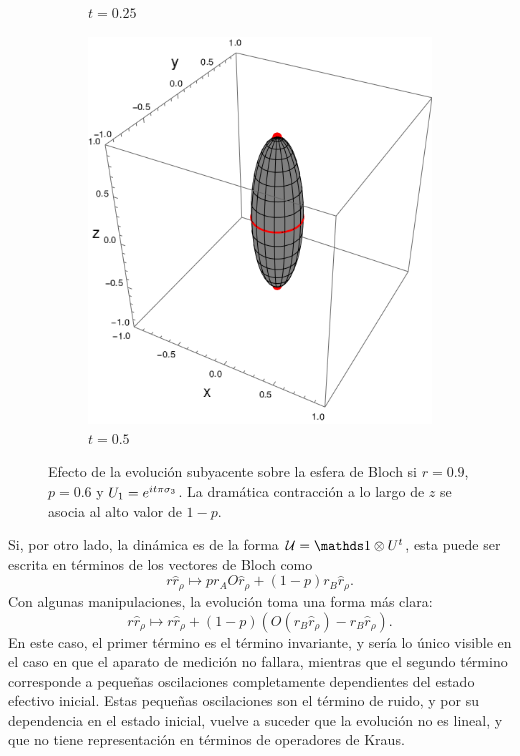 \begin{figure}[h!]
\begin{subfigure}{0.32\textwidth}
      \caption{$t=0.25$}
    \end{subfigure}
    \begin{subfigure}{0.32\textwidth}
      \centering
      \includegraphics[width=0.9\linewidth]{chapter3/figures_separable/U1xU2_H1=Pi(sz)_H2=Id_z=0.9_p=0.6t=0.5.png}
      \caption{$t=0.5$}
    \end{subfigure}
    \caption{Efecto de la evolución subyacente sobre la esfera de Bloch si $r=0.9$, $p=0.6$ y $U_{1}=e^{it\pi \sigma_{3}}$. La dramática contracción a lo largo de $z$ se asocia al alto valor de $1-p$.}
    \label{fig:FaseChangeSequence}
\end{figure}

Si, por otro lado, la dinámica es de la forma $\mcU=\Id\otimes U^{t}$, esta puede ser escrita en términos de los vectores de Bloch como
\begin{equation*}
    r\hat{r}_{\rho}\mapsto pr_{A}O\hat{r}_{\rho}+(1-p)r_{B}\hat{r}_{\rho}.
\end{equation*}
Con algunas manipulaciones, la evolución toma una forma más clara:
\begin{equation*}
    r\hat{r}_{\rho}\mapsto r\hat{r}_{\rho}+(1-p)(O(r_{B}\hat{r}_{\rho})-r_{B}\hat{r}_{\rho}).
\end{equation*}
En este caso, el primer término es el término invariante, y sería lo único visible en el caso en que el aparato de medición no fallara, mientras que el segundo término corresponde a pequeñas oscilaciones completamente dependientes del estado efectivo inicial. Estas pequeñas oscilaciones son el término de ruido, y por su dependencia en el estado inicial, vuelve a suceder que la evolución no es lineal, y que no tiene representación en términos de operadores de Kraus.

